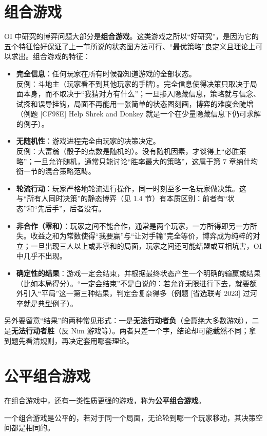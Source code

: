 \section{组合游戏}
OI 中研究的博弈问题大部分是\textbf{组合游戏}。这类游戏之所以“好研究”，是因为它的五个特征恰好保证了上一节所说的状态图方法可行、“最优策略”良定义且理论上可以求出。组合游戏的特征：
\begin{itemize}
\item \textbf{完全信息}：任何玩家在所有时候都知道游戏的全部状态。\\
反例：斗地主（玩家看不到其他玩家的手牌）。完全信息使得决策只取决于局面本身，而不取决于“我猜对方有什么”；一旦掺入隐藏信息，策略就与信念、试探和误导挂钩，局面不再能用一张简单的状态图刻画，博弈的难度会陡增（例题 [CF98E] Help Shrek and Donkey 就是一个在少量隐藏信息下仍可求解的例子）。
\item \textbf{无随机性}：游戏进程完全由玩家的决策决定。\\
反例：大富翁（骰子的点数是随机的）。没有随机因素，才谈得上“必胜策略”；一旦允许随机，通常只能讨论“胜率最大的策略”，这属于第 7 章纳什均衡一节的混合策略范畴。
\item \textbf{轮流行动}：玩家严格地轮流进行操作，同一时刻至多一名玩家做决策。这与“所有人同时决策”的静态博弈（见 1.4 节）有本质区别：前者有“状态”和“先后手”，后者没有。
\item \textbf{非合作（零和）}：玩家之间不能合作，通常是两个玩家，一方所得即另一方所失。收益之和为常数使得“我要赢”与“让对手输”完全等价，博弈成为纯粹的对立；一旦出现三人以上或非零和的局面，玩家之间还可能结盟或互相坑害，OI 中几乎不出现。
\item \textbf{确定性的结果}：游戏一定会结束，并根据最终状态产生一个明确的输赢或结果（比如本局得分）。“一定会结束”不是白说的：若允许无限进行下去，就要额外引入“平局”这一第三种结果，判定会复杂得多（例题 [省选联考 2023] 过河卒就是典型例子）。
\end{itemize}

另外要留意“结果”的两种常见形式：一是\textbf{无法行动者负}（全篇绝大多数游戏），二是\textbf{无法行动者胜}（反 Nim 游戏等）。两者只差一个字，结论却可能截然不同；拿到题先看清规则，再决定套用哪套理论。

\section{公平组合游戏}
在组合游戏中，还有一类性质更强的游戏，称为\textbf{公平组合游戏}。

\begin{definition}[公平组合游戏]
一个组合游戏是公平的，若对于同一个局面，无论轮到哪一个玩家移动，其决策空间都是相同的。
\end{definition}

